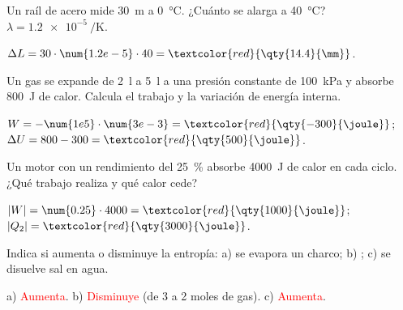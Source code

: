 \begin{exercise}
    Un raíl de acero mide \qty{30}{\m} a \qty{0}{\degreeCelsius}. ¿Cuánto se alarga a \qty{40}{\degreeCelsius}? \(\lambda =
    \qty{1.2e-5}{\per\kelvin}\).
    \begin{solu}
        \(\Delta L = 30 \cdot \num{1.2e-5} \cdot 40 = \textcolor{red}{\qty{14.4}{\mm}}\).
    \end{solu}
\end{exercise}

\begin{exercise}
    Un gas se expande de \qty{2}{\litre} a \qty{5}{\litre} a una presión constante de \qty{100}{\kilo\pascal} y absorbe \qty{800}{\joule}
    de calor. Calcula el trabajo y la variación de energía interna.
    \begin{solu}
        \(W = -\num{1e5} \cdot \num{3e-3} = \textcolor{red}{\qty{-300}{\joule}}\); \(\Delta U = 800 - 300 = \textcolor{red}{\qty{500}{\joule}}\).
    \end{solu}
\end{exercise}

\begin{exercise}
    Un motor con un rendimiento del \qty{25}{\percent} absorbe \qty{4000}{\joule} de calor en cada ciclo. ¿Qué trabajo realiza y qué
    calor cede?
    \begin{solu}
        \(|W| = \num{0.25} \cdot 4000 = \textcolor{red}{\qty{1000}{\joule}}\); \(|Q_2| = \textcolor{red}{\qty{3000}{\joule}}\).
    \end{solu}
\end{exercise}

\begin{exercise}
    Indica si aumenta o disminuye la entropía: a) se evapora un charco; b) ; c) se disuelve sal en
    agua.
    \begin{solu}
        a) \textcolor{red}{Aumenta}. b) \textcolor{red}{Disminuye} (de 3 a 2 moles de gas). c) \textcolor{red}{Aumenta}.
    \end{solu}
\end{exercise}
